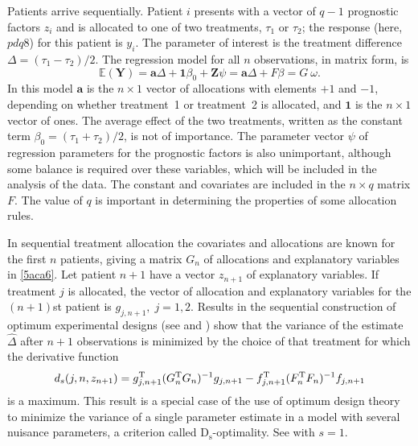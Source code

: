 \documentclass[number,12pt,review]{elsarticle}
\begin{document}
\label{SeqDesSec}

Patients arrive sequentially. Patient $i$ presents with a vector of $q-1$ prognostic factors $z_i$ and is allocated to one of two treatments, $\tau_1$ or $\tau_2$; the response (here, $pdq8$) for this patient is $y_i$.
The parameter of interest is  the treatment difference $\Delta = (\tau_1 - \tau_2)/2$.  The regression model for all $n$ observations, in matrix form, is
\begin{equation}
\mathbb{E}(\mathbf{Y}) = \mathbf{a} \Delta + \mathbf{1} \beta_0 + \mathbf{Z} \psi = \mathbf{a} \Delta + F \beta = G ~\omega.
\label{5aca6}
\end{equation}
In this model  $\mathbf{a}$ is the $n \times 1$ vector of allocations with elements $+1$
and $-1$, depending on whether treatment~1 or treatment~2 is
allocated, and $\mathbf{1}$ is the $n \times 1$ vector of ones. The average effect of the two treatments, written as the constant
term $\beta_0 = (\tau_1 + \tau_2)/2$, is not of importance. The parameter vector $\psi$ of regression parameters for the prognostic factors is also unimportant, although some  balance is required over these variables, which will be included in the analysis of the data. The constant and covariates are included in the
$n \times q$ matrix $F$. The value of $q$ is important in determining the properties of some allocation rules.

In sequential treatment allocation the covariates and allocations are known for the first $n$ patients, giving a matrix $G_n$ of allocations and explanatory variables in \eqref{5aca6}. Let patient $n+1$ have a vector  $z_{n+1}$ of explanatory variables. If treatment $j$ is allocated, the vector of allocation and explanatory variables for the $(n+1)$st patient is $g_{j,n+1},\; j = 1,2 $. Results in the sequential construction of optimum experimental designs (see \citet{aca:82} and \citet[\S 10]{rls:84b}) show that the variance of the estimate $\hat{\Delta}$ after $n+1$ observations is minimized by the choice of that treatment for which the derivative function
\begin{equation}
d_s(j,n,z_{n+1}) =  g^{\rm T}_{j,n+1}(G_n^{\rm T}G_n)^{-1}  g_{j,n+1} -
f^{\rm T}_{j,n+1}(F_n^{\rm T}F_n)^{-1}  f_{j,n+1}
\label{5defd}
\end{equation}
is a maximum. This result is a special case of the use of optimum design theory to minimize the variance of a single parameter estimate in a model with several nuisance parameters, a criterion called D$_{\text{s}}$-optimality. See \citet[\S10.3]{ADT:2007} with $s = 1$.
\end{document}
